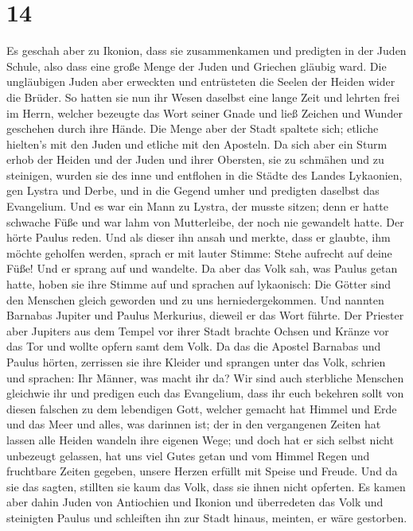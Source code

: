 \hypertarget{section-13}{%
\section{14}\label{section-13}}

 Es geschah aber zu Ikonion, dass sie zusammenkamen und
predigten in der Juden Schule, also dass eine große Menge der Juden und
Griechen gläubig ward.  Die ungläubigen Juden aber
erweckten und entrüsteten die Seelen der Heiden wider die Brüder.
 So hatten sie nun ihr Wesen daselbst eine lange Zeit und
lehrten frei im Herrn, welcher bezeugte das Wort seiner Gnade und ließ
Zeichen und Wunder geschehen durch ihre Hände.  Die Menge
aber der Stadt spaltete sich; etliche hielten's mit den Juden und
etliche mit den Aposteln.  Da sich aber ein Sturm erhob
der Heiden und der Juden und ihrer Obersten, sie zu schmähen und zu
steinigen,  wurden sie des inne und entflohen in die
Städte des Landes Lykaonien, gen Lystra und Derbe, und in die Gegend
umher  und predigten daselbst das Evangelium.
 Und es war ein Mann zu Lystra, der musste sitzen; denn er
hatte schwache Füße und war lahm von Mutterleibe, der noch nie gewandelt
hatte.  Der hörte Paulus reden. Und als dieser ihn ansah
und merkte, dass er glaubte, ihm möchte geholfen werden, 
sprach er mit lauter Stimme: Stehe aufrecht auf deine Füße! Und er
sprang auf und wandelte.  Da aber das Volk sah, was
Paulus getan hatte, hoben sie ihre Stimme auf und sprachen auf
lykaonisch: Die Götter sind den Menschen gleich geworden und zu uns
herniedergekommen.  Und nannten Barnabas Jupiter und
Paulus Merkurius, dieweil er das Wort führte.  Der
Priester aber Jupiters aus dem Tempel vor ihrer Stadt brachte Ochsen und
Kränze vor das Tor und wollte opfern samt dem Volk.  Da
das die Apostel Barnabas und Paulus hörten, zerrissen sie ihre Kleider
und sprangen unter das Volk, schrien  und sprachen: Ihr
Männer, was macht ihr da? Wir sind auch sterbliche Menschen gleichwie
ihr und predigen euch das Evangelium, dass ihr euch bekehren sollt von
diesen falschen zu dem lebendigen Gott, welcher gemacht hat Himmel und
Erde und das Meer und alles, was darinnen ist;  der in
den vergangenen Zeiten hat lassen alle Heiden wandeln ihre eigenen Wege;
 und doch hat er sich selbst nicht unbezeugt gelassen,
hat uns viel Gutes getan und vom Himmel Regen und fruchtbare Zeiten
gegeben, unsere Herzen erfüllt mit Speise und Freude. 
Und da sie das sagten, stillten sie kaum das Volk, dass sie ihnen nicht
opferten.  Es kamen aber dahin Juden von Antiochien und
Ikonion und überredeten das Volk und steinigten Paulus und schleiften
ihn zur Stadt hinaus, meinten, er wäre gestorben.


